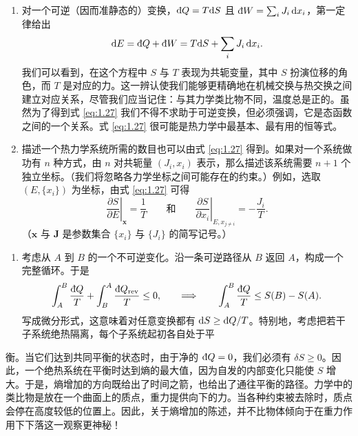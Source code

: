 \begin{enumerate}[leftmargin=2.2em, start=3, itemsep=0.4em]
  \item 对一个可逆（因而准静态的）变换，$\inexd Q=T\mathrm{d}S$ 且 $\inexd W=\sum_iJ_i\,\mathrm{d}x_i$，第一定律给出
\begin{equation}
\mathrm{d}E=\inexd Q+\inexd W=T\mathrm{d}S+\sum_iJ_i\,\mathrm{d}x_i.
\label{eq:1.27}
\end{equation}
我们可以看到，在这个方程中 $S$ 与 $T$ 表现为共轭变量，其中 $S$ 扮演位移的角色，而 $T$ 是对应的力。这一辨认使我们能够更精确地在机械交换与热交换之间建立对应关系，尽管我们应当记住：与其力学类比物不同，温度总是正的。虽然为了得到式 \eqref{eq:1.27} 我们不得不求助于可逆变换，但必须强调，它是态函数之间的一个关系。式 \eqref{eq:1.27} 很可能是热力学中最基本、最有用的恒等式。

  \item 描述一个热力学系统所需的数目也可以由式 \eqref{eq:1.27} 得到。如果对一个系统做功有 $n$ 种方式，由 $n$ 对共轭量 $(J_i,x_i)$ 表示，那么描述该系统需要 $n+1$ 个独立坐标。（我们将忽略各力学坐标之间可能存在的约束。）例如，选取 $(E,\{x_i\})$ 为坐标，由式 \eqref{eq:1.27} 可得
\begin{equation}
\left.\frac{\partial S}{\partial E}\right|_{\bm{x}}=\frac{1}{T}\qquad\text{和}\qquad\left.\frac{\partial S}{\partial x_i}\right|_{E,x_{j\neq i}}=-\frac{J_i}{T}.
\label{eq:1.28}
\end{equation}
（$\bm{x}$ 与 $\bm{J}$ 是参数集合 $\{x_i\}$ 与 $\{J_i\}$ 的简写记号。）
\end{enumerate}


\begin{enumerate}[leftmargin=2.2em, start=5, itemsep=0.4em]
  \item 考虑从 $A$ 到 $B$ 的一个不可逆变化。沿一条可逆路径从 $B$ 返回 $A$，构成一个完整循环。于是
\begin{equation}
\int_A^B\frac{\inexd Q}{T}+\int_B^A\frac{\inexd Q_{\text{rev}}}{T}\le0,\qquad\Longrightarrow\qquad\int_A^B\frac{\inexd Q}{T}\le S(B)-S(A).
\label{eq:1.29}
\end{equation}
写成微分形式，这意味着对任意变换都有 $\mathrm{d}S\ge\inexd Q/T$。特别地，考虑把若干子系统绝热隔离，每个子系统起初各自处于平
\end{enumerate}

衡。当它们达到共同平衡的状态时，由于净的 $\inexd Q=0$，我们必须有 $\delta S\ge0$。因此，一个绝热系统在平衡时达到熵的最大值，因为自发的内部变化只能使 $S$ 增大。于是，熵增加的方向既给出了时间之箭，也给出了通往平衡的路径。力学中的类比物是放在一个曲面上的质点，重力提供向下的力。当各种约束被去除时，质点会停在高度较低的位置上。因此，关于熵增加的陈述，并不比物体倾向于在重力作用下下落这一观察更神秘！

